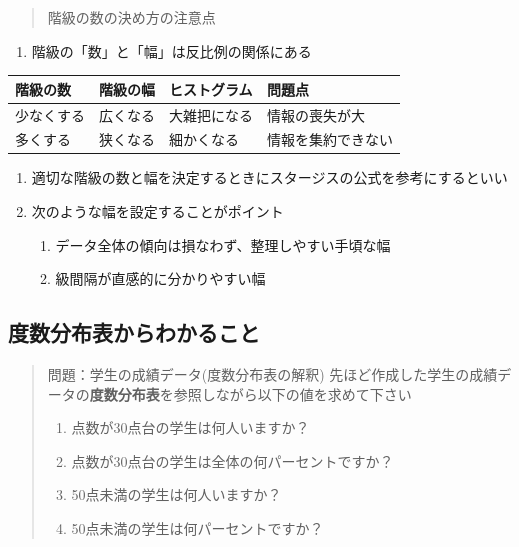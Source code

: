 \documentclass[
]{book}
\providecommand{\tightlist}{%
  \setlength{\itemsep}{0pt}\setlength{\parskip}{0pt}}
\theoremstyle{definition}
\theoremstyle{definition}
\theoremstyle{definition}
\theoremstyle{definition}
\theoremstyle{remark}
\begin{document}
\begin{quote}
階級の数の決め方の注意点
\end{quote}

\begin{enumerate}
\def\labelenumi{\arabic{enumi}.}
\tightlist
\item
  階級の「数」と「幅」は反比例の関係にある
\end{enumerate}

\begin{longtable}[]{@{}llll@{}}
\toprule()
階級の数 & 階級の幅 & ヒストグラム & 問題点 \\
\midrule()
\endhead
少なくする & 広くなる & 大雑把になる & 情報の喪失が大 \\
多くする & 狭くなる & 細かくなる & 情報を集約できない \\
\bottomrule()
\end{longtable}

\begin{enumerate}
\def\labelenumi{\arabic{enumi}.}
\setcounter{enumi}{1}
\item
  適切な階級の数と幅を決定するときにスタージスの公式を参考にするといい
\item
  次のような幅を設定することがポイント

  \begin{enumerate}
  \def\labelenumii{\arabic{enumii}.}
  \tightlist
  \item
    データ全体の傾向は損なわず、整理しやすい手頃な幅
  \item
    級間隔が直感的に分かりやすい幅
  \end{enumerate}
\end{enumerate}

\hypertarget{ux5ea6ux6570ux5206ux5e03ux8868ux304bux3089ux308fux304bux308bux3053ux3068}{%
\subsection{度数分布表からわかること}\label{ux5ea6ux6570ux5206ux5e03ux8868ux304bux3089ux308fux304bux308bux3053ux3068}}

\begin{quote}
問題：学生の成績データ(度数分布表の解釈)
先ほど作成した学生の成績データの\textbf{度数分布表}を参照しながら以下の値を求めて下さい

\begin{enumerate}
\def\labelenumi{\arabic{enumi}.}
\tightlist
\item
  点数が30点台の学生は何人いますか？
\item
  点数が30点台の学生は全体の何パーセントですか？
\item
  50点未満の学生は何人いますか？
\item
  50点未満の学生は何パーセントですか？
\end{enumerate}
\end{quote}
\end{document}
